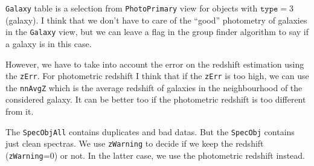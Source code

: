 \texttt{Galaxy} table is a selection from \texttt{PhotoPrimary} view for
objects with $\mathrm{\texttt{type}}=3$ (galaxy). I think that we don't have to
care of the ``good'' photometry of galaxies in the \texttt{Galaxy} view, but we
can leave a flag in the group finder algorithm to say if a galaxy is in this
case.

However, we have to take into account the error on the redshift estimation
using the \texttt{zErr}. For photometric redshift I think that if the
\texttt{zErr} is too high, we can use the \texttt{nnAvgZ} which is the average
redshift of galaxies in the neighbourhood of the considered galaxy. It can be
better too if the photometric redshift is too different from it.

The \texttt{SpecObjAll} contains duplicates and bad datas. But the
\texttt{SpecObj} contains just clean spectras. We use \texttt{zWarning} to
decide if we keep the redshift (\texttt{zWarning}=0) or not. In the latter
case, we use the photometric redshift instead.
%

